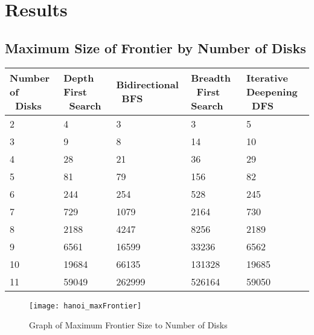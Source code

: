 \documentclass[conference]{IEEEtran}
\begin{document}
\section{Results}

\subsection{Maximum Size of Frontier by Number of Disks}

\begin{tabular}{ | p{0.97cm} | p{1cm} | p{2cm} | p{1cm} | p{1.2cm} |}
    \hline
    Number of \ Disks & Depth First \ Search & Bidirectional \ BFS & Breadth \ First Search & Iterative Deepening \ DFS \\ \hline
    2 & 4 & 3 & 3 & 5 \\ \hline
    3 & 9 & 8 & 14 & 10 \\ \hline
    4 & 28 & 21 & 36 & 29 \\ \hline
    5 & 81 & 79 & 156 & 82 \\ \hline
    6 & 244 & 254 & 528 & 245 \\ \hline
    7 & 729 & 1079 & 2164 & 730 \\ \hline
    8 & 2188 & 4247 & 8256 & 2189 \\ \hline
    9 & 6561 & 16599 & 33236 & 6562 \\ \hline
    10 & 19684 & 66135 & 131328 & 19685 \\ \hline
    11 & 59049 & 262999 & 526164 & 59050 \\ \hline
\end{tabular}

\begin{figure}
\centering
\texttt{[image: hanoi\_maxFrontier]}
\caption{Graph of Maximum Frontier Size to Number of Disks }
\label{fig:my_label}
\end{figure}
\end{document}
